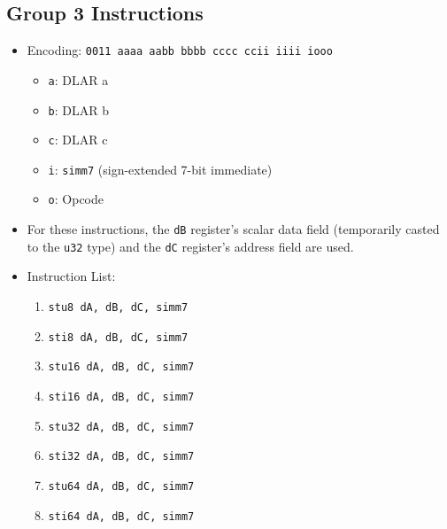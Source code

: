 \documentclass{article}
\begin{document}
	\subsection{Group 3 Instructions}
		\begin{itemize}
		\item Encoding: \texttt{0011 aaaa aabb bbbb  cccc ccii iiii iooo}
			\begin{itemize}
			\item \texttt{a}:  DLAR a
			\item \texttt{b}:  DLAR b
			\item \texttt{c}:  DLAR c
			\item \texttt{i}:  \texttt{simm7} (sign-extended 7-bit
			immediate)
			\item \texttt{o}:  Opcode
			\end{itemize}

		\item For these instructions, the \texttt{dB} register's scalar
		data field (temporarily casted to the \texttt{u32} type) and the
		\texttt{dC} register's address field are used. 

		\item Instruction List:
			\begin{enumerate}
			\item \texttt{stu8 dA, dB, dC, simm7}
			\item \texttt{sti8 dA, dB, dC, simm7}
			\item \texttt{stu16 dA, dB, dC, simm7}
			\item \texttt{sti16 dA, dB, dC, simm7}
			\item \texttt{stu32 dA, dB, dC, simm7}
			\item \texttt{sti32 dA, dB, dC, simm7}
			\item \texttt{stu64 dA, dB, dC, simm7}
			\item \texttt{sti64 dA, dB, dC, simm7}
			\end{enumerate}
		\end{itemize}
		\newpage
\end{document}
